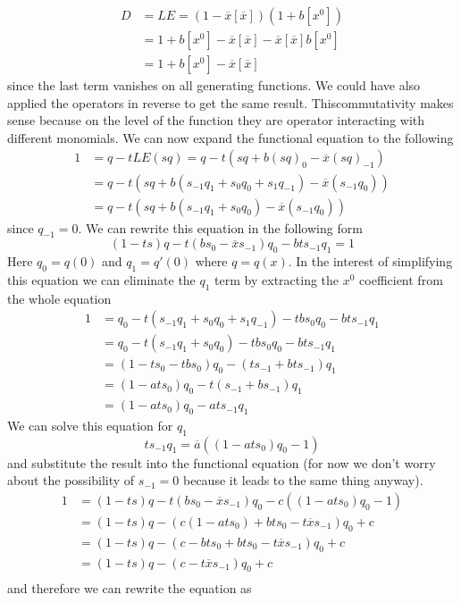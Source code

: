 \documentclass[12pt]{article}
\theoremstyle{definition} \newtheorem{definition}[theorem]{Definition}
\newcommand{\ol}[1]{\overline{#1}}
\begin{document}
\begin{align*}
	D &= LE = (1 - \ol{x}[\ol{x}])(1 + b[x^0]) \\
	&= 1 + b[x^0] - \ol{x}[\ol{x}]-\ol{x}[\ol{x}]b[x^0]\\
	&=1 + b[x^0] - \ol{x}[\ol{x}]
\end{align*}
since the last term vanishes on all generating functions. We could have also applied the operators in reverse to get the same result. Thiscommutativity  makes sense because on the level of the function they are operator interacting with different monomials. We can now expand the functional equation to the following
\begin{align*}
	1 &= q - tLE(sq) = q - t(sq + b(sq)_0 - \ol{x}(sq)_{-1}) \\
	&=  q - t(sq + b(s_{-1}q_1 + s_0q_0 + s_1 q_{-1}) - \ol{x}(s_{-1}q_0))\\
	&= q - t(sq + b(s_{-1}q_1 + s_0q_0) - \ol{x}(s_{-1}q_0))
\end{align*}
since $q_{-1} = 0$. We can rewrite this equation in the following form
\[
	(1-ts)q - t(bs_0-\ol{x}s_{-1})q_0 -bts_{-1}q_1 = 1
\]
Here $q_0 = q(0)$ and $q_1 = q'(0)$ where $q = q(x)$. In the interest of simplifying this equation we can eliminate the $q_1$ term by extracting the $x^0$ coefficient from the whole equation
\begin{align*}
	 1 &= q_0 - t(s_{-1}q_1 +s_0 q_0 + s_1 q_{-1}) - tbs_0q_0 - bts_{-1}q_1\\
	 &= q_0 - t(s_{-1}q_1 +s_0 q_0) - tbs_0q_0 - bts_{-1}q_1\\
	 &=(1-ts_0-tbs_0)q_0 - (ts_{-1}+bts_{-1})q_1\\
	 &= (1-ats_0)q_0-t(s_{-1}+bs_{-1})q_1\\
	 &=(1-ats_0)q_0-ats_{-1}q_1
\end{align*}
We can solve this equation for $q_1$
\[
	ts_{-1}q_1 = \ol{a}((1-ats_0)q_0-1)
\]
and substitute the result into the functional equation (for now we don't worry about the possibility of $s_{-1} = 0$ because it leads to the same thing anyway).
\begin{align*}
	1 &= (1-ts)q - t(bs_0-\ol{x}s_{-1})q_0 - c((1-ats_0)q_0-1)\\
	& = (1-ts)q - (c(1-ats_0)+ bts_0-t\ol{x}s_{-1})q_0 + c\\
	& = (1-ts)q - (c - bt s_0 + bt s_0-t\ol{x}s_{-1})q_0 + c \\
	& = (1-ts)q - (c -t\ol{x}s_{-1})q_0 + c \\
\end{align*}
and therefore we can rewrite the equation as
\end{document}
